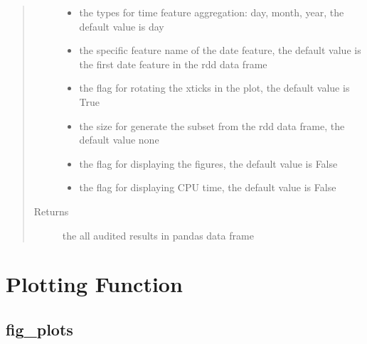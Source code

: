 \documentclass[letterpaper,12pt,english]{sphinxmanual}
\begin{document}
\begin{fulllineitems}
\begin{quote}
\begin{description}
\begin{itemize}
\item {} 
 \textendash{} the types for time feature aggregation: day, month, year, the default value is day

\item {} 
 \textendash{} the specific feature name of the date feature, the default value
is the first date feature in the rdd data frame

\item {} 
 \textendash{} the flag for rotating the xticks in the plot, the default value is True

\item {} 
 \textendash{} the size for generate the subset from the rdd data frame, the
default value none

\item {} 
 \textendash{} the flag for displaying the figures, the default value is False

\item {} 
 \textendash{} the flag for displaying CPU time, the default value is False

\end{itemize}

\item[{Returns}] \leavevmode
the all audited results in pandas data frame

\end{description}\end{quote}

\end{fulllineitems}



\section{Plotting Function}
\label{\detokenize{basics:plotting-function}}

\subsection{fig\_plots}
\label{\detokenize{basics:fig-plots}}
\end{document}
